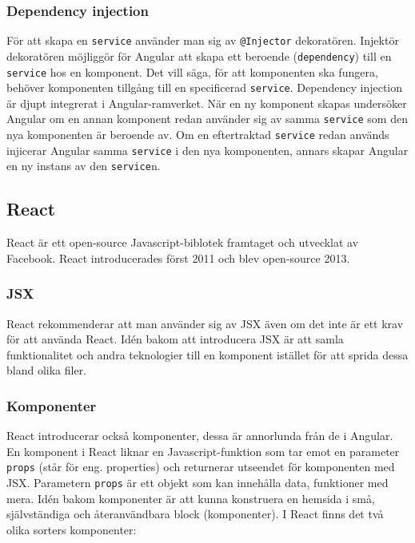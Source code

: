 
\subsubsection{Dependency injection}
För att skapa en \texttt{service} använder man sig av \texttt{@Injector} dekoratören. Injektör dekoratören möjliggör för Angular att skapa ett beroende (\texttt{dependency}) till en \texttt{service} hos en komponent. Det vill säga, för att komponenten ska fungera, behöver komponenten tillgång till en specificerad \texttt{service}. Dependency injection är djupt integrerat i Angular-ramverket. När en ny komponent skapas undersöker Angular om en annan komponent redan använder sig av samma \texttt{service} som den nya komponenten är beroende av. Om en eftertraktad \texttt{service} redan används injicerar Angular samma \texttt{service} i den nya komponenten, annars skapar Angular en ny instans av den \texttt{service}n. \cite{angular-services}


\subsection{React}
\label{axel:react}
React är ett open-source Javascript-biblotek framtaget och utvecklat av Facebook. React introducerades först 2011 och blev open-source 2013. \cite{react-date}


\subsubsection{JSX}
React rekommenderar att man använder sig av JSX även om det inte är ett krav för att använda React. Idén bakom att introducera JSX är att samla funktionalitet och andra teknologier till en komponent istället för att sprida dessa bland olika filer. \cite{react-jsx}


\subsubsection{Komponenter}
React introducerar också komponenter, dessa är annorlunda från de i Angular. En komponent i React liknar en Javascript-funktion som tar emot en parameter \texttt{props} (står för eng. properties) och returnerar utseendet för komponenten med JSX. Parametern \texttt{props} är ett objekt som kan innehålla data, funktioner med mera. Idén bakom komponenter är att kunna konstruera en hemsida i små, självständiga och återanvändbara block (komponenter). \cite{react-components} I React finns det två olika sorters komponenter:

